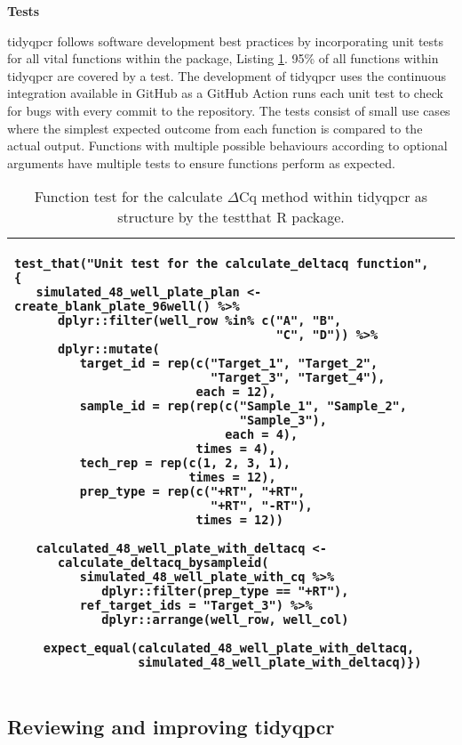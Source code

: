 \documentclass[../main.tex]{subfiles}
\begin{document}
\newpage
\textbf{Tests}

tidyqpcr follows software development best practices by incorporating unit tests for all vital functions within the package, Listing \ref{function-tests}. 
95\% of all functions within tidyqpcr are covered by a test. 
The development of tidyqpcr uses the continuous integration available in GitHub as a GitHub Action runs each unit test to check for bugs with every commit to the repository. 
The tests consist of small use cases where the simplest expected outcome from each function is compared to the actual output. 
Functions with multiple possible behaviours according to optional arguments have multiple tests to ensure functions perform as expected. 

\begin{table}
\centering
\begin{tabular}{| m{10cm} |}
\hline
\begin{lstlisting}[style=mystyle]
test_that("Unit test for the calculate_deltacq function",
{
   simulated_48_well_plate_plan <- create_blank_plate_96well() %>%
      dplyr::filter(well_row %in% c("A", "B",
                                    "C", "D")) %>%
      dplyr::mutate(
         target_id = rep(c("Target_1", "Target_2",
                           "Target_3", "Target_4"),
                         each = 12),
         sample_id = rep(rep(c("Sample_1", "Sample_2",
                               "Sample_3"),
                             each = 4),
                         times = 4),
         tech_rep = rep(c(1, 2, 3, 1),
                        times = 12),
         prep_type = rep(c("+RT", "+RT",
                           "+RT", "-RT"),
                         times = 12))

   calculated_48_well_plate_with_deltacq <- 
      calculate_deltacq_bysampleid(
         simulated_48_well_plate_with_cq %>%
            dplyr::filter(prep_type == "+RT"), 
         ref_target_ids = "Target_3") %>%
            dplyr::arrange(well_row, well_col)

    expect_equal(calculated_48_well_plate_with_deltacq,        
                 simulated_48_well_plate_with_deltacq)})
\end{lstlisting} \\
\hline
\end{tabular}
\caption{Function test for the calculate $\Delta$Cq method within tidyqpcr as structure by the testthat R package.}
\label{function-tests}
\end{table}

\subsection{Reviewing and improving tidyqpcr}
\end{document}
